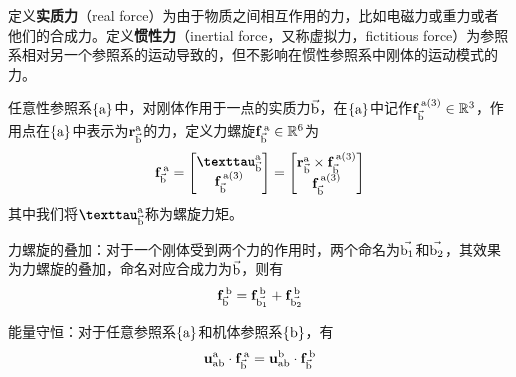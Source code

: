 \documentclass[12pt, a4paper, article, UTF8]{ctexart}
\begin{document}
\begin{mydefinition}
定义\textbf{实质力}（real force）为由于物质之间相互作用的力，比如电磁力或重力或者他们的合成力。定义\textbf{惯性力}（inertial force，又称虚拟力，fictitious force）为参照系相对另一个参照系的运动导致的，但不影响在惯性参照系中刚体的运动模式的力。
\end{mydefinition}

\begin{mydefinition}
任意性参照系$\{\textnormal{a}\}$中，对刚体作用于一点的实质力$\vec{\textnormal{b}}$，在$\{\textnormal{a}\}$中记作$\mathbf{f}_{\vec{\textnormal{b}}}^{\,\textnormal{a}\textnormal{(3)}}\in\mathbb{R}^3$，作用点在$\{\textnormal{a}\}$中表示为$\mathbf{r}_{\vec{\textnormal{b}}}^{\textnormal{a}}$的力，定义力螺旋$\mathbf{f}_{\vec{\textnormal{b}}}^{\,\textnormal{a}}\in\mathbb{R}^6$为
\begin{align*}
\mathbf{f}_{\vec{\textnormal{b}}}^{\,\textnormal{a}}  = \begin{bmatrix}
\textbf{\texttau}_{\vec{\textnormal{b}}}^{\textnormal{a}}\\ \mathbf{f}_{\vec{\textnormal{b}}}^{\,\textnormal{a}\textnormal{(3)}} 
\end{bmatrix} = \begin{bmatrix}
\mathbf{r}_{\vec{\textnormal{b}}}^{\textnormal{a}} \times \mathbf{f}_{\vec{\textnormal{b}}}^{\,\textnormal{a}\textnormal{(3)}} \\
\mathbf{f}_{\vec{\textnormal{b}}}^{\,\textnormal{a}\textnormal{(3)}} 
\end{bmatrix}
\end{align*}
其中我们将$\textbf{\texttau}_{\vec{\textnormal{b}}}^{\textnormal{a}}$称为螺旋力矩。
\end{mydefinition}

\begin{mytheorem}
力螺旋的叠加：对于一个刚体受到两个力的作用时，两个命名为$\vec{\textnormal{b}_1}$和$\vec{\textnormal{b}_2}$，其效果为力螺旋的叠加，命名对应合成力为$\vec{\textnormal{b}}$，则有
\begin{align*}
\mathbf{f}_{\vec{\textnormal{b}}}^{\,\textnormal{b}} = \mathbf{f}_{\vec{\textnormal{b}_1}}^{\,\textnormal{b}} + \mathbf{f}_{\vec{\textnormal{b}_2}}^{\,\textnormal{b}}
\end{align*} \label{th:sumofwrench}
\end{mytheorem}

\begin{mytheorem}
能量守恒：对于任意参照系$\{\textnormal{a}\}$和机体参照系$\{\textnormal{b}\}$，有
\begin{align*}
\mathbf{u}_\textnormal{ab}^\textnormal{a} \cdot \mathbf{f}_{\vec{\textnormal{b}}}^{\,\textnormal{a}} = \mathbf{u}_\textnormal{ab}^\textnormal{b} \cdot \mathbf{f}_{\vec{\textnormal{b}}}^{\,\textnormal{b}}
\end{align*} 
\end{mytheorem}
\end{document}
